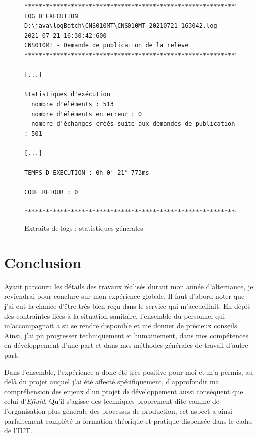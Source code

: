 \documentclass[a4paper, 12pt]{report}
\begin{document}
\begin{figure}[t]
  \begin{center}
    \begin{lstlisting}
*******************************************************************
LOG D'EXECUTION
D:\java\logBatch\CNS010MT\CNS010MT-20210721-163042.log
2021-07-21 16:30:42:600
CNS010MT - Demande de publication de la relève
*******************************************************************

[...]

Statistiques d'exécution
  nombre d'éléments : 513
  nombre d'éléments en erreur : 0
  nombre d'échanges créés suite aux demandes de publication : 501

[...]

TEMPS D'EXECUTION : 0h 0' 21" 773ms

CODE RETOUR : 0

*******************************************************************
      \end{lstlisting}
    \caption{Extraits de logs : statistiques générales}
    \label{logs}
  \end{center}
\end{figure}

\chapter*{Conclusion}

Ayant parcouru les détails des travaux réalisés durant mon année d'alternance, je reviendrai pour conclure sur mon expérience globale. Il faut d'abord noter que j'ai eut la chance d'être très bien reçu dans le service qui m'accueillait. En dépit des contraintes liées à la situation sanitaire, l'ensemble du personnel qui m'accompagnait a su se rendre disponible et me donner de précieux conseils. Ainsi, j'ai pu progresser techniquement et humainement, dans mes compétences en développement d'une part et dans mes méthodes générales de travail d'autre part.

Dans l'ensemble, l'expérience a donc été très positive pour moi et m'a permis, au delà du projet auquel j'ai été affecté spécifiquement, d'approfondir ma compréhension des enjeux d'un projet de développement aussi conséquent que celui d'\textit{Efluid}.  Qu'il s'agisse des techniques proprement dite comme de l'organisation plus générale des processus de production, cet aspect a ainsi parfaitement complété la formation théorique et pratique dispensée dans le cadre de l'IUT.\\
\end{document}
